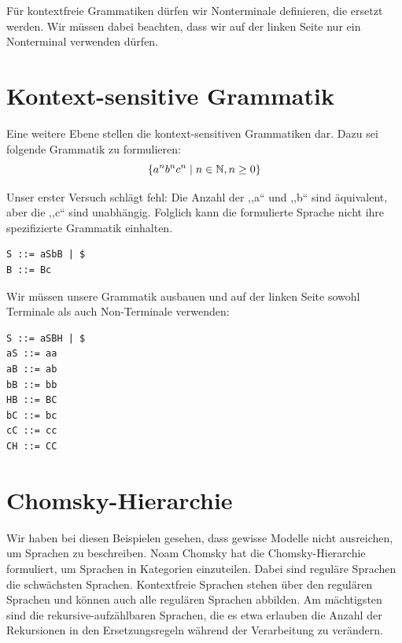 Für kontextfreie Grammatiken dürfen wir Nonterminale definieren, die ersetzt werden. Wir müssen dabei beachten, dass wir auf der linken Seite nur ein Nonterminal verwenden dürfen. %

\section{Kontext-sensitive Grammatik}
%
Eine weitere Ebene stellen die kontext-sensitiven Grammatiken dar. Dazu sei folgende Grammatik zu formulieren:
\[
  \left\{a^n b^n c^n \mid n \in \mathbb{N}, n \geq 0\right\}
\]

Unser erster Versuch schlägt fehl: Die Anzahl der ,,a`` und ,,b`` sind äquivalent, aber die ,,c`` sind unabhängig. Folglich kann die formulierte Sprache nicht ihre spezifizierte Grammatik einhalten.
\begin{lstlisting}
S ::= aSbB | $
B ::= Bc
\end{lstlisting}

Wir müssen unsere Grammatik ausbauen und auf der linken Seite sowohl Terminale als auch Non-Terminale verwenden:
\begin{lstlisting}
S ::= aSBH | $
aS ::= aa
aB ::= ab
bB ::= bb
HB ::= BC
bC ::= bc
cC ::= cc
CH ::= CC
\end{lstlisting}

\section{Chomsky-Hierarchie}
%
Wir haben bei diesen Beispielen gesehen, dass gewisse Modelle nicht ausreichen, um Sprachen zu beschreiben. Noam Chomsky hat die Chomsky-Hierarchie formuliert, um Sprachen in Kategorien einzuteilen. Dabei sind reguläre Sprachen die schwächsten Sprachen. Kontextfreie Sprachen stehen über den regulären Sprachen und können auch alle regulären Sprachen abbilden. Am mächtigsten sind die rekursive-aufzählbaren Sprachen, die es etwa erlauben die Anzahl der Rekursionen in den Ersetzungsregeln während der Verarbeitung zu verändern.

